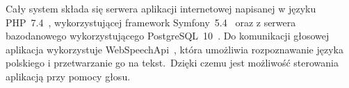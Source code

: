 Cały system składa się serwera aplikacji internetowej napisanej w języku PHP~7.4~\cite{Php2023}, wykorzystującej framework Symfony~5.4~\cite{Sym2023} oraz z serwera bazodanowego wykorzystującego PostgreSQL~10~\cite{Pos023}. Do komunikacji głosowej aplikacja wykorzystuje WebSpeechApi~\cite{WebSpeechApi}, która umożliwia rozpoznawanie języka polskiego i przetwarzanie go na tekst.\ Dzięki czemu jest możliwość sterowania aplikacją przy pomocy głosu.